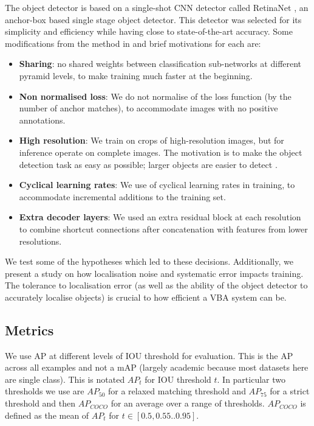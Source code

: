 \documentclass[conference]{IEEEtran}
\begin{document}
The object detector is based on a single-shot \gls{CNN} detector called RetinaNet \cite{Lin2017}, an anchor-box based single stage object detector. This detector was selected for its simplicity and efficiency while having close to state-of-the-art accuracy. Some modifications from the method in \cite{Lin2017} and brief motivations for each are:

\begin{itemize}
    \item {\textbf {Sharing}}: no shared weights between classification sub-networks at different pyramid levels, to make training much faster at the beginning.
    \item {\textbf {Non normalised loss}}:
    We do not normalise of the loss function (by the number of anchor matches), to accommodate images with no positive annotations.
    \item {\textbf {High resolution}}: We train on crops of high-resolution images, but for inference operate on complete images. The motivation is to make the object detection task as easy as possible; larger objects are easier to detect \cite{Lin2014}. 
    \item {\textbf {Cyclical learning rates}}: We use of cyclical learning rates in training, to accommodate incremental additions to the training set.
    \item {\textbf{Extra decoder layers}}: We used an extra residual block at each resolution to combine shortcut connections after concatenation with features from lower resolutions.
\end{itemize}

We test some of the hypotheses which led to these decisions. Additionally, we present a study on how localisation noise and systematic error impacts training. The tolerance to localisation error (as well as the ability of the object detector to accurately localise objects) is crucial to how efficient a \gls{VBA} system can be.

\subsection{Metrics}

We use \gls{AP} at different levels of \gls{IOU} threshold for evaluation. This is the \gls{AP} across all examples and not a \gls{mAP} (largely academic because most datasets here are single class). This is notated $AP_{t}$ for \gls{IOU} threshold $t$. In particular two thresholds we use are $AP_{50}$ for a relaxed matching threshold and $AP_{75}$ for a strict threshold and then $AP_{COCO}$ for an average over a range of thresholds. $AP_{COCO}$ is defined as the mean of $AP_t$ for $t \in [0.5, 0.55..0.95]$.
\end{document}
